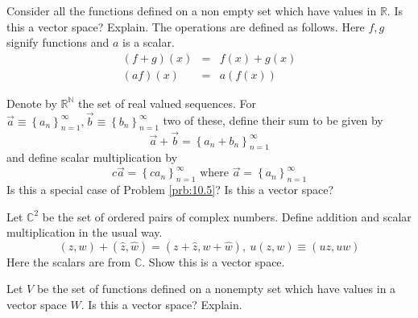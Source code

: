 \documentclass{ximera}
\begin{document}
\begin{problem}\label{prb:10.5} \label{functions}Consider all the functions defined on a non empty set
which have values in $\mathbb{R}$. Is this a vector space? Explain.
The operations are defined as follows. Here $f,g$ signify functions and $a$
is a scalar.
\begin{eqnarray*}
\left( f+g\right) \left( x\right) &=&f\left( x\right) +g\left( x\right) \\
\left( af\right) \left( x\right) &=&a\left( f\left( x\right) \right)
\end{eqnarray*}
\end{problem}


\begin{problem}\label{prb:10.6} Denote by $\mathbb{R}^{\mathbb{N}}$ the set of real valued sequences.
For $\vec{a}\equiv \left\{ a_{n}\right\} _{n=1}^{\infty },\vec{b}\equiv
\left\{ b_{n}\right\} _{n=1}^{\infty }$ two of these, define their sum to be
given by
\begin{equation*}
\vec{a}+\vec{b} =  \left\{ a_{n}+b_{n}\right\} _{n=1}^{\infty }
\end{equation*}
and define scalar multiplication by
\begin{equation*}
c\vec{a}=\left\{ ca_{n}\right\} _{n=1}^{\infty }\text{ where }\vec{a}
=\left\{ a_{n}\right\} _{n=1}^{\infty }
\end{equation*}
Is this a special case of Problem \ref{prb:10.5}? Is this a vector space?
\end{problem}

\begin{problem}\label{prb:10.7} Let $\mathbb{C}^{2}$ be the set of ordered pairs of complex numbers.
Define addition and scalar multiplication in the usual way.
\begin{equation*}
\left( z,w\right) +\left( \hat{z},\hat{w}\right) = \left( z+\hat{z},w+
\hat{w}\right) ,\ u\left( z,w\right) \equiv \left( uz,uw\right)
\end{equation*}
Here the scalars are from $\mathbb{C}$. Show this is a vector space.
\end{problem}

\begin{problem}\label{prb:10.8} Let $V$ be the set of functions defined on a nonempty set which have
values in a vector space $W.$ Is this a vector space? Explain.
\end{problem}
\end{document}
